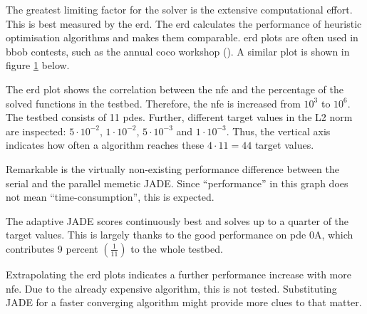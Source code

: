 \documentclass[./\jobname.tex]{subfiles}
\begin{document}
The greatest limiting factor for the solver is the extensive computational effort. This is best measured by the \gls{erd}. The \gls{erd} calculates the performance of heuristic optimisation algorithms and makes them comparable. \gls{erd} plots are often used in \gls{bbob} contests, such as the annual \gls{coco} workshop (\cite{nikolaus_hansen_2019_2594848}). A similar plot is shown in figure \ref{fig:ert_plot} below. 

The \gls{erd} plot shows the correlation between the \gls{nfe} and the percentage of the solved functions in the testbed. Therefore, the \gls{nfe} is increased from $10^3$ to $10^6$. The testbed consists of 11 \gls{pde}s. Further, different target values in the L2 norm are inspected: $5\cdot 10^{-2}$, $1\cdot 10^{-2}$, $5\cdot 10^{-3}$ and $1\cdot 10^{-3}$. Thus, the vertical axis indicates how often a algorithm reaches these $4 \cdot 11 = 44$ target values. 

\begin{figure}[H]
	\centering
	\noindent{}
	\label{fig:ert_plot}
\end{figure}

Remarkable is the virtually non-existing performance difference between the serial and the parallel memetic JADE. Since ``performance'' in this graph does not mean ``time-consumption'', this is expected.

The adaptive JADE scores continuously best and solves up to a quarter of the target values. This is largely thanks to the good performance on \gls{pde} 0A, which contributes 9 percent $\left( \frac{1}{11} \right)$ to the whole testbed.  

Extrapolating the \gls{erd} plots indicates a further performance increase with more \gls{nfe}. Due to the already expensive algorithm, this is not tested. Substituting JADE for a faster converging algorithm might provide more clues to that matter. 
\end{document}
